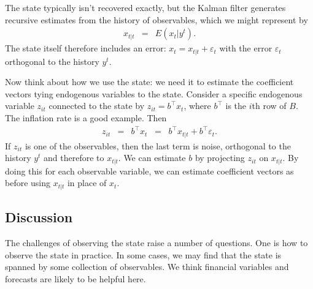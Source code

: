 \documentclass[12pt]{article}
\begin{document}
{The state typically isn't recovered exactly, but the Kalman filter generates
recursive estimates from the history of observables, which we might represent by
\begin{eqnarray*}
    {x}_{t|t} &=& E \left( x_t | y^{t} \right).
\end{eqnarray*}
The state itself therefore includes an error:  $ x_t = {x}_{t|t} + \varepsilon_t $
with the error $\varepsilon_t$ orthogonal to the history $y^{t}$.

Now think about how we use the state:  we need it to
estimate the coefficient vectors tying endogenous variables to the state.
Consider a specific endogenous variable $z_{it}$ connected to the state by
$ z_{it} = b^\top x_t $, where $b^\top$ is the $i$th row of $B$.
The inflation rate is a good example.
Then
\begin{eqnarray*}
    z_{it}  &=& b^\top x_t
        \;\;=\;\; b^\top {x}_{t|t} + b^\top \varepsilon_t .
\end{eqnarray*}
If $z_{it}$ is one of the observables, then the last term is noise, orthogonal to the history $y^t$
and therefore to $x_{t|t}$.
We can estimate $b$ by projecting $z_{it}$ on $x_{t|t}$. %
By doing this for each observable variable,
we can estimate coefficient vectors as before
using ${x}_{t|t}$ in place of $x_t$.



\subsection{Discussion}
\label{sec:state-discussion}

The challenges of observing the state raise a number of questions.
One is how to observe the state in practice.
In some cases, we may find that the state is spanned by
some collection of observables.
We think financial variables and forecasts are likely to be helpful here.

}
\end{document}
